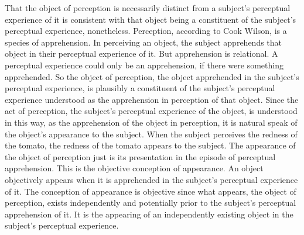 \documentclass[12pt]{article}
\begin{document}
That the object of perception is necessarily distinct from a subject's perceptual experience of it is consistent with that object being a constituent of the subject's perceptual experience, nonetheless. Perception, according to Cook Wilson, is a species of apprehension. In perceiving an object, the subject apprehends that object in their perceptual experience of it. But apprehension is relational. A perceptual experience could only be an apprehension, if there were something apprehended. So the object of perception, the object apprehended in the subject's perceptual experience, is plausibly a constituent of the subject's perceptual experience understood as the apprehension in perception of that object. Since the act of perception, the subject's perceptual experience of the object, is understood in this way, as the apprehension of the object in perception, it is natural speak of the object's appearance to the subject. When the subject perceives the redness of the tomato, the redness of the tomato appears to the subject. The appearance of the object of perception just is its presentation in the episode of perceptual apprehension. This is the objective conception of appearance. An object objectively appears when it is apprehended in the subject's perceptual experience of it. The conception of appearance is objective since what appears, the object of perception, exists independently and potentially prior to the subject's perceptual apprehension of it. It is the appearing of an independently existing object in the subject's perceptual experience.
\end{document}
